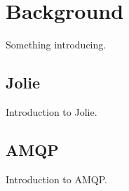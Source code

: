 \section{Background}
Something introducing.
\subsection{Jolie}
Introduction to Jolie.
\subsection{AMQP}
Introduction to AMQP.
\newpage